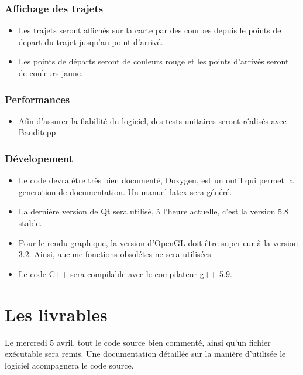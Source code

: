 \documentclass[12pt]{article}
\begin{document}
			\subsubsection{Affichage des trajets}
				\begin{itemize}
					\item Les trajets seront affichés sur la carte par des courbes depuis le points de depart du trajet jusqu'au point d'arrivé.
					\item Les points de départs seront de couleurs rouge et les points d'arrivés seront de couleurs jaune.
				\end{itemize}


			\subsubsection{Performances}
				\begin{itemize}
					\item Afin d'assurer la fiabilité du logiciel, des tests unitaires seront réalisés avec Banditcpp. 
				\end{itemize}

			\subsubsection{Dévelopement}
				\begin{itemize}
					\item Le code devra être très bien documenté, Doxygen, est un outil qui permet la generation de documentation. Un manuel latex sera généré.
					\item La dernière version de Qt sera utilisé, à l'heure actuelle, c'est la version 5.8 stable.
					\item Pour le rendu graphique, la version d'OpenGL doit être superieur à la version 3.2. Ainsi, aucune fonctions obsolétes ne sera utilisées.
					\item Le code C++ sera compilable avec le compilateur g++ 5.9.
				\end{itemize}
	\newpage

	\section{Les livrables}
		Le mercredi 5 avril, tout le code source bien commenté, ainsi qu'un fichier exécutable sera remis. Une documentation détaillée sur la manière d'utilisée le logiciel acompagnera le code source.
	\newpage

	
\end{document}
